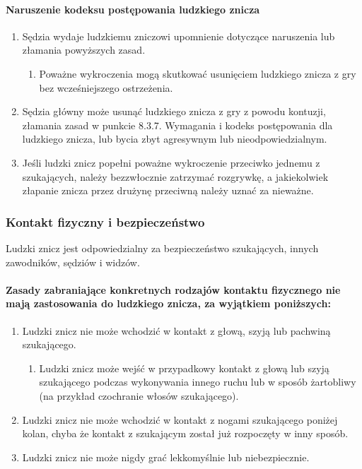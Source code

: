 \documentclass[12pt]{article}
\begin{document}
\paragraph{Naruszenie kodeksu postępowania ludzkiego znicza}

\begin{enumerate}
\item Sędzia wydaje ludzkiemu zniczowi upomnienie dotyczące naruszenia lub
złamania powyższych zasad.
\begin{enumerate}
\item Poważne wykroczenia mogą skutkować usunięciem ludzkiego znicza z gry
bez wcześniejszego ostrzeżenia.
\end{enumerate}

\item Sędzia główny może usunąć ludzkiego znicza z gry z powodu kontuzji,
złamania zasad w punkcie 8.3.7. Wymagania i kodeks postępowania dla
ludzkiego znicza, lub bycia zbyt agresywnym lub nieodpowiedzialnym.

\item Jeśli ludzki znicz popełni poważne wykroczenie przeciwko jednemu z
szukających, należy bezzwłocznie zatrzymać rozgrywkę, a jakiekolwiek
złapanie znicza przez drużynę przeciwną należy uznać za nieważne.
\end{enumerate}

\subsubsection{Kontakt fizyczny i bezpieczeństwo}

Ludzki znicz jest odpowiedzialny za bezpieczeństwo szukających, innych
zawodników, sędziów i widzów.

\paragraph{Zasady zabraniające konkretnych rodzajów kontaktu
fizycznego nie mają zastosowania do ludzkiego znicza, za wyjątkiem
poniższych:}

\begin{enumerate}
\item Ludzki znicz nie może wchodzić w kontakt z głową, szyją lub pachwiną
szukającego.
\begin{enumerate}
\item Ludzki znicz może wejść w przypadkowy kontakt z głową lub szyją
szukającego podczas wykonywania innego ruchu lub w sposób żartobliwy (na
przykład czochranie włosów szukającego).
\end{enumerate}

\item Ludzki znicz nie może wchodzić w kontakt z nogami szukającego poniżej
kolan, chyba że kontakt z szukającym został już rozpoczęty w inny
sposób.

\item Ludzki znicz nie może nigdy grać lekkomyślnie lub niebezpiecznie.
\end{enumerate}
\end{document}
